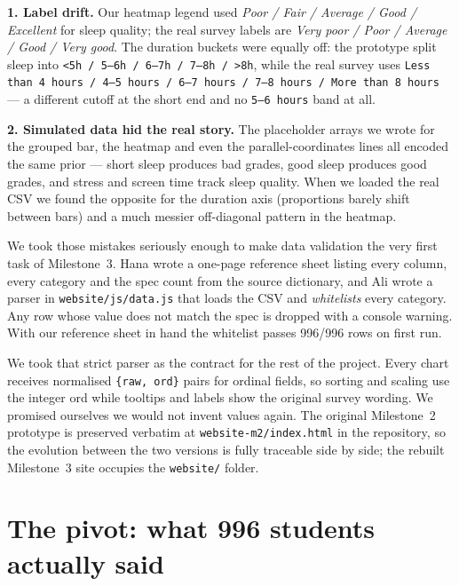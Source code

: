 \documentclass[11pt,a4paper]{article}
\newcommand{\code}[1]{\texttt{\small #1}}
\begin{document}
\begin{tcolorbox}[title={Two mistakes baked into the prototype}]
\textbf{1. Label drift.} Our heatmap legend used \emph{Poor / Fair / Average / Good / Excellent} for sleep quality; the real survey labels are \emph{Very poor / Poor / Average / Good / Very good}. The duration buckets were equally off: the prototype split sleep into \code{<5h / 5--6h / 6--7h / 7--8h / >8h}, while the real survey uses \code{Less than 4 hours / 4--5 hours / 6--7 hours / 7--8 hours / More than 8 hours} — a different cutoff at the short end and no \code{5--6 hours} band at all.

\textbf{2. Simulated data hid the real story.} The placeholder arrays we wrote for the grouped bar, the heatmap and even the parallel-coordinates lines all encoded the same prior — short sleep produces bad grades, good sleep produces good grades, and stress and screen time track sleep quality. When we loaded the real CSV we found the opposite for the duration axis (proportions barely shift between bars) and a much messier off-diagonal pattern in the heatmap.
\end{tcolorbox}

We took those mistakes seriously enough to make data validation the very first task of Milestone~3. Hana wrote a one-page reference sheet listing every column, every category and the spec count from the source dictionary, and Ali wrote a parser in \code{website/js/data.js} that loads the CSV and \emph{whitelists} every category. Any row whose value does not match the spec is dropped with a console warning. With our reference sheet in hand the whitelist passes 996/996 rows on first run.

We took that strict parser as the contract for the rest of the project. Every chart receives normalised \code{\{raw, ord\}} pairs for ordinal fields, so sorting and scaling use the integer ord while tooltips and labels show the original survey wording. We promised ourselves we would not invent values again. The original Milestone~2 prototype is preserved verbatim at \code{website-m2/index.html} in the repository, so the evolution between the two versions is fully traceable side by side; the rebuilt Milestone~3 site occupies the \code{website/} folder.

\section{The pivot: what 996 students actually said}
\label{sec:pivot}
\end{document}
